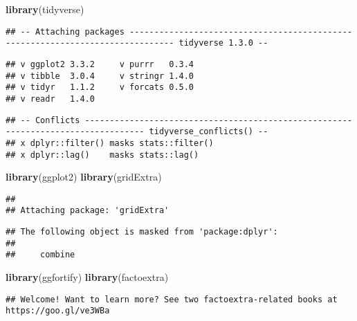 \documentclass[]{article}
\newenvironment{Shaded}{\begin{snugshade}}{\end{snugshade}}
\newcommand{\KeywordTok}[1]{\textcolor[rgb]{0.13,0.29,0.53}{\textbf{#1}}}
\newcommand{\NormalTok}[1]{#1}
\begin{document}
\begin{Shaded}
\begin{Highlighting}[]
\KeywordTok{library}\NormalTok{(tidyverse)}
\end{Highlighting}
\end{Shaded}

\begin{verbatim}
## -- Attaching packages ------------------------------------------------------------------------------- tidyverse 1.3.0 --
\end{verbatim}

\begin{verbatim}
## v ggplot2 3.3.2     v purrr   0.3.4
## v tibble  3.0.4     v stringr 1.4.0
## v tidyr   1.1.2     v forcats 0.5.0
## v readr   1.4.0
\end{verbatim}

\begin{verbatim}
## -- Conflicts ---------------------------------------------------------------------------------- tidyverse_conflicts() --
## x dplyr::filter() masks stats::filter()
## x dplyr::lag()    masks stats::lag()
\end{verbatim}

\begin{Shaded}
\begin{Highlighting}[]
\KeywordTok{library}\NormalTok{(ggplot2)}
\KeywordTok{library}\NormalTok{(gridExtra)}
\end{Highlighting}
\end{Shaded}

\begin{verbatim}
## 
## Attaching package: 'gridExtra'
\end{verbatim}

\begin{verbatim}
## The following object is masked from 'package:dplyr':
## 
##     combine
\end{verbatim}

\begin{Shaded}
\begin{Highlighting}[]
\KeywordTok{library}\NormalTok{(ggfortify)}
\KeywordTok{library}\NormalTok{(factoextra)}
\end{Highlighting}
\end{Shaded}

\begin{verbatim}
## Welcome! Want to learn more? See two factoextra-related books at https://goo.gl/ve3WBa
\end{verbatim}
\end{document}
